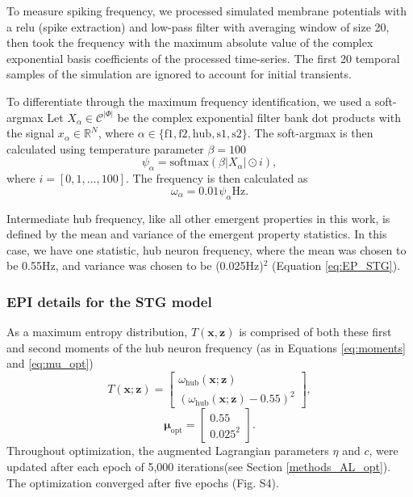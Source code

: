 \documentclass[11pt]{article}
\begin{document}
To measure spiking frequency, we processed simulated membrane potentials with a relu (spike extraction) and low-pass filter with averaging window of size 20, then took the frequency with the maximum absolute value of the complex exponential basis coefficients of the processed time-series.  The first 20 temporal samples of the simulation are ignored to account for initial transients.

To differentiate through the maximum frequency identification, we used a soft-argmax
Let $X_\alpha \in \mathcal{C}^{|\Phi|}$ be the complex exponential filter bank dot products with the signal $x_\alpha \in \mathbb{R}^{N}$, where $\alpha \in \{ \text{f1}, \text{f2}, \text{hub}, \text{s1}, \text{s2} \}$.  
The soft-argmax is then calculated using temperature parameter $\beta=100$
\begin{equation}
\psi_\alpha = \text{softmax}(\beta|X_\alpha|\odot i),
\end{equation}
where $i = [0, 1, ..., 100]$.
The frequency is then calculated as 
\begin{equation}
\omega_\alpha = 0.01\psi_\alpha \text{Hz}.
\end{equation}

Intermediate hub frequency, like all other emergent properties in this work, is defined by the mean and variance of the emergent property statistics.
In this case, we have one statistic, hub neuron frequency, where the mean was chosen to be 0.55Hz, and variance was chosen to be (0.025Hz)$^2$ (Equation \ref{eq:EP_STG}).

\subsubsection{EPI details for the STG model} \label{methods_stg_epi}
As a maximum entropy distribution, $T(\mathbf{x}, \mathbf{z})$ is comprised of both these first and second moments of the hub neuron frequency (as in Equations \ref{eq:moments} and \ref{eq:mu_opt})
\begin{equation} 
T(\mathbf{x}; \mathbf{z}) = \begin{bmatrix} \omega_{\text{hub}}(\mathbf{x}; \mathbf{z}) \\ \left( \omega_{\text{hub}}(\mathbf{x}; \mathbf{z}) - 0.55 \right)^2 \end{bmatrix},
\end{equation}
\begin{equation} 
\bm{\mu}_{\text{opt}} = \begin{bmatrix} 0.55 \\ 0.025^2 \end{bmatrix}.
\end{equation}
Throughout optimization, the augmented Lagrangian parameters $\eta$ and $c$, were updated after each epoch of 5,000 iterations(see Section \ref{methods_AL_opt}).  
The optimization converged after five epochs (Fig. S4).
\end{document}
